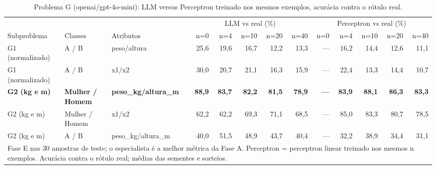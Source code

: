 \begin{table}[htbp]
\centering
\footnotesize
\caption{Problema G (openai/gpt-4o-mini): LLM versus Perceptron treinado nos mesmos exemplos, acurácia contra o rótulo real.}
\label{tab:bloco3_G_faseE_LLM_vs_perceptron_gpt4mini}
\begin{tabular}{lllrrrrrrrrrr}
\toprule
 &  &  & \multicolumn{5}{c}{LLM vs real (\%)} & \multicolumn{5}{c}{Perceptron vs real (\%)} \\ \cmidrule(lr){4-8} \cmidrule(lr){9-13}
Subproblema & Classes & Atributos & n=0 & n=4 & n=10 & n=20 & n=40 & n=0 & n=4 & n=10 & n=20 & n=40 \\
\midrule
G1 (normalizado) & A / B & peso/altura & 25,6 & 19,6 & 16,7 & 12,2 & 13,3 & — & 16,2 & 14,4 & 12,6 & 11,1 \\
G1 (normalizado) & A / B & x1/x2 & 30,0 & 20,7 & 21,1 & 16,3 & 15,9 & — & 22,4 & 13,3 & 14,4 & 10,7 \\
\textbf{G2 (kg e m)} & \textbf{Mulher / Homem} & \textbf{peso\_kg/altura\_m} & \textbf{88,9} & \textbf{83,7} & \textbf{82,2} & \textbf{81,5} & \textbf{78,9} & \textbf{—} & \textbf{83,9} & \textbf{88,1} & \textbf{86,3} & \textbf{83,3} \\
G2 (kg e m) & Mulher / Homem & x1/x2 & 62,2 & 62,2 & 69,3 & 71,1 & 68,5 & — & 85,0 & 83,3 & 80,7 & 78,5 \\
G2 (kg e m) & A / B & peso\_kg/altura\_m & 40,0 & 51,5 & 48,9 & 43,7 & 40,4 & — & 32,2 & 38,9 & 34,4 & 31,1 \\
\bottomrule
\multicolumn{13}{p{0.95\linewidth}}{\footnotesize Fase E nas 30 amostras de teste; o especialista é a melhor métrica da Fase A. Perceptron = perceptron linear treinado nos mesmos n exemplos. Acurácia contra o rótulo real; médias das sementes e sorteios.} \\
\end{tabular}
\end{table}
